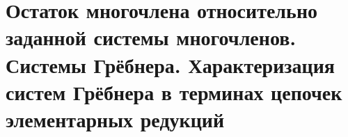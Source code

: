 \section{Остаток многочлена относительно заданной системы многочленов. Системы Грёбнера. Характеризация систем Грёбнера в терминах цепочек элементарных редукций}